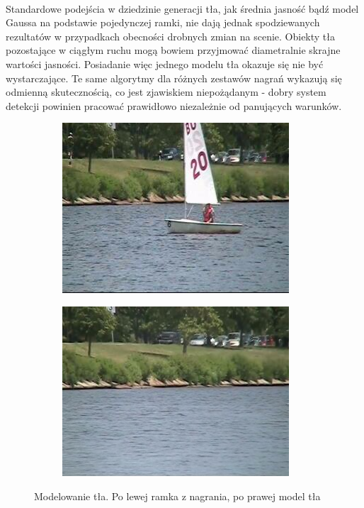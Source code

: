 \paragraph{}
Standardowe podejścia w dziedzinie generacji tła, jak średnia jasność bądź model Gaussa na podstawie pojedynczej ramki, nie dają jednak spodziewanych rezultatów w przypadkach obecności drobnych zmian na scenie. Obiekty tła pozostające w ciągłym ruchu mogą bowiem przyjmować diametralnie skrajne wartości jasności. Posiadanie więc jednego modelu tła okazuje się nie być wystarczające. Te same algorytmy dla różnych zestawów nagrań wykazują się odmienną skutecznością, co jest zjawiskiem niepożądanym - dobry system detekcji powinien pracować prawidłowo niezależnie od panujących warunków.
\begin{figure}[!htb]
\centering
\begin{subfigure}[b]{0.4\textwidth}
\includegraphics[width=\textwidth]{img/fg}
\caption{}
\end{subfigure}
\quad
\begin{subfigure}[b]{0.4\textwidth}
\includegraphics[width=\textwidth]{img/bg}
\caption{}
\end{subfigure}
\caption{Modelowanie tła. Po lewej ramka z nagrania, po prawej model tła \label{fig:bgModel}}
\end{figure}
